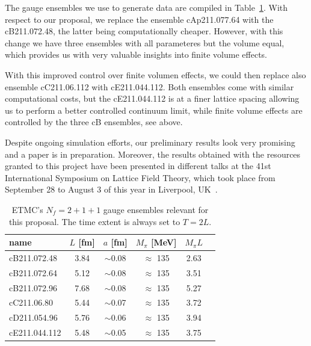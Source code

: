 \documentclass [a4paper, 11pt]{article}
\begin{document}
The gauge ensembles we use to generate data are compiled in Table~\ref{tab:ensembles}.
With respect to our proposal, we replace the ensemble cAp211.077.64
with the cB211.072.48, the latter being computationally
cheaper. However, with this change we have three ensembles with all
parameteres but the volume equal, which provides us with very valuable
insights into finite volume effects.

With this improved control over finite volumen effects, we could then
replace also ensemble cC211.06.112 with cE211.044.112. Both 
ensembles come with similar computational costs, but the cE211.044.112
is at a finer lattice spacing allowing us to perform a better
controlled continuum limit, while finite volume effects are controlled
by the three cB ensembles, see above.

Despite ongoing simulation efforts, our preliminary results
look very promising and a paper is in preparation.  
Moreover, the results obtained with the resources granted to this
project have been presented in different talks at the 41st
International Symposium on Lattice Field Theory, which took place from
September 28 to August 3 of this year in Liverpool, UK~\cite{talklatt2024_ale,talklatt2024_chr}.


\begin{table}[h]
  \centering %
  \begin{tabular}{lccccr} %
    \hline
    name          & $L$ [fm]      & $a$
    [fm]          & $M_\pi$ [MeV] & $M_\pi L$                         \\
    \hline
    \hline
    cB211.072.48  & 3.84          & $\sim$0.08 & $\approx$ 135 & 2.63 \\
    cB211.072.64  & 5.12          & $\sim$0.08 & $\approx$ 135 & 3.51 \\
    cB211.072.96  & 7.68          & $\sim$0.08 & $\approx$ 135 & 5.27 \\
    \hline
    cC211.06.80   & 5.44          & $\sim$0.07 & $\approx$ 135 & 3.72 \\
    \hline
    cD211.054.96  & 5.76          & $\sim$0.06 & $\approx$ 135 & 3.94 \\
    \hline
    cE211.044.112 & 5.48          & $\sim$0.05 & $\approx$ 135 & 3.75 \\
    \hline
  \end{tabular}
  \caption{ETMC's $N_f=2+1+1$ gauge ensembles relevant for this
    proposal. The time extent is always set to $T=2L$.}
  \label{tab:ensembles}
\end{table}
\end{document}
